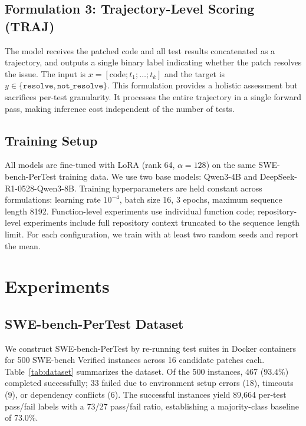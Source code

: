 \documentclass[11pt,a4paper]{article}
\begin{document}
\subsection{Formulation 3: Trajectory-Level Scoring (TRAJ)}

The model receives the patched code and all test results concatenated as a trajectory, and outputs a single binary label indicating whether the patch resolves the issue.
The input is $x = [\text{code}; t_1; \ldots; t_k]$ and the target is $y \in \{\texttt{resolve}, \texttt{not\_resolve}\}$.
This formulation provides a holistic assessment but sacrifices per-test granularity.
It processes the entire trajectory in a single forward pass, making inference cost independent of the number of tests.

\subsection{Training Setup}

All models are fine-tuned with LoRA (rank 64, $\alpha{=}128$) on the same SWE-bench-PerTest training data.
We use two base models: Qwen3-4B and DeepSeek-R1-0528-Qwen3-8B.
Training hyperparameters are held constant across formulations: learning rate $10^{-4}$, batch size 16, 3 epochs, maximum sequence length 8192.
Function-level experiments use individual function code; repository-level experiments include full repository context truncated to the sequence length limit.
For each configuration, we train with at least two random seeds and report the mean.

\section{Experiments}
\label{sec:results}

\subsection{SWE-bench-PerTest Dataset}
\label{sec:dataset}

We construct SWE-bench-PerTest by re-running test suites in Docker containers for 500 SWE-bench Verified instances across 16 candidate patches each.
Table~\ref{tab:dataset} summarizes the dataset.
Of the 500 instances, 467 (93.4\%) completed successfully; 33 failed due to environment setup errors (18), timeouts (9), or dependency conflicts (6).
The successful instances yield 89,664 per-test pass/fail labels with a 73/27 pass/fail ratio, establishing a majority-class baseline of 73.0\%.
\end{document}
